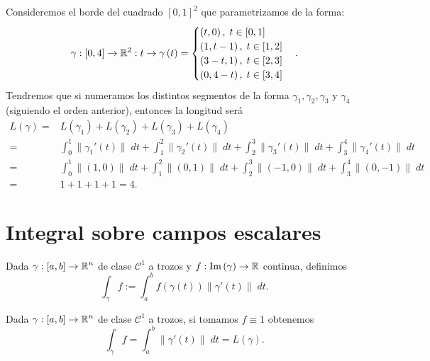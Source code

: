 \begin{eg}
	Consideremos el borde del cuadrado $\displaystyle \left[0,1\right] ^{2} $ que parametrizamos de la forma:
	\[\gamma : \left[0,4\right] \to \mathbb{R}^{2} : t \to \gamma\left(t\right)=
	\begin{cases}
		\left(t,0\right), \; t \in \left[0,1\right]  \\
		\left(1,t-1\right), \; t \in \left[1,2\right] \\
		\left(3-t, 1\right), \; t \in \left[2,3\right]  \\
		\left(0,4-t\right), \; t \in \left[3,4\right] 
	\end{cases}
	.\]
	Tendremos que si numeramos los distintos segmentos de la forma $\displaystyle \gamma_{1}, \gamma_{2}, \gamma_{3} $ y $\displaystyle \gamma_{4} $ (siguiendo el orden anterior), entonces la longitud será
\[
\begin{split}
	L\left(\gamma \right)= & L\left(\gamma_{1}\right)+L\left(\gamma_{2}\right)+L\left(\gamma_{3}\right)+L\left(\gamma_{4}\right)\\
	= & \int^{1}_{0} \|\gamma_{1}'\left(t\right)\| \; dt + \int^{2}_{1} \|\gamma_{2}'\left(t\right)\| \; dt+\int^{3}_{2} \|\gamma_{3}'\left(t\right)\| \; dt + \int^{4}_{3} \|\gamma_{4}'\left(t\right)\| \; dt \\
	= & \int^{1}_{0} \|\left(1,0\right)\| \; dt+\int^{2}_{1} \|\left(0,1\right)\| \; dt + \int^{3}_{2} \|\left(-1,0\right)\| \; dt+\int^{4}_{3} \|\left(0,-1\right)\| \; dt\\
	= & 1+1+1+1 = 4.
\end{split}
\]	
\end{eg}

\section{Integral sobre campos escalares}
\begin{definition}
	Dada $\displaystyle \gamma : \left[a,b\right] \to \mathbb{R}^{n} $ de clase $\displaystyle \mathcal{C}^{1} $ a trozos y $\displaystyle f : \operatorname{Im}\left(\gamma \right) \to \mathbb{R} $ continua, definimos
	\[\int _{\gamma }f := \int^{b}_{a} f\left(\gamma\left(t\right)\right)\|\gamma'\left(t\right)\| \; dt .\]
\end{definition}
\begin{observation}
	Dada $\displaystyle \gamma : \left[a,b\right] \to \mathbb{R}^{n} $ de clase $\displaystyle \mathcal{C}^{1} $ a trozos, si tomamos $\displaystyle f \equiv 1 $ obtenemos
	\[\int _{\gamma }f =\int^{b}_{a} \|\gamma'\left(t\right)\| \; dt = L\left(\gamma \right) .\]
\end{observation}

